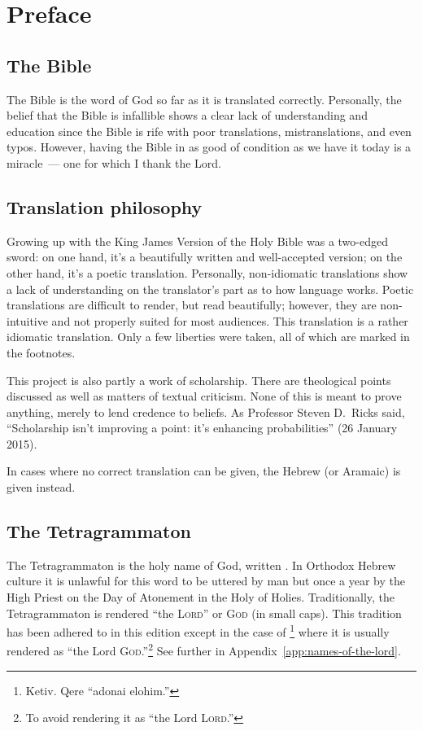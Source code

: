 \chapter{Preface}\thispagestyle{empty}
\section{The Bible}
The Bible is the word of God so far as it is translated correctly. Personally, the belief that the Bible is infallible shows a clear lack of understanding and education since the Bible is rife with poor translations, mistranslations, and even typos. However, having the Bible in as good of condition as we have it today is a miracle~--- one for which I thank the Lord.

\section{Translation philosophy}
Growing up with the King James Version of the Holy Bible was a two-edged sword: on one hand, it's a beautifully written and well-accepted version; on the other hand, it's a poetic translation. Personally, non-idiomatic translations show a lack of understanding on the translator's part as to how language works. Poetic translations are difficult to render, but read beautifully; however, they are non-intuitive and not properly suited for most audiences. This translation is a rather idiomatic translation. Only a few liberties were taken, all of which are marked in the footnotes.

This project is also partly a work of scholarship. There are theological points discussed as well as matters of textual criticism. None of this is meant to prove anything, merely to lend credence to beliefs. As Professor Steven D.\ Ricks said, ``Scholarship isn't improving a point: it's enhancing probabilities'' (26 January 2015).

In cases where no correct translation can be given, the Hebrew (or Aramaic) is given instead.

\section{The Tetragrammaton}
The Tetragrammaton is the holy name of God, written . In Orthodox Hebrew culture it is unlawful for this word to be uttered by man but once a year by the High Priest on the Day of Atonement in the Holy of Holies. Traditionally, the Tetragrammaton is rendered ``the \textsc{Lord}'' or \textsc{God} (in small caps). This tradition has been adhered to in this edition except in the case of \footnote{Ketiv. Qere ``adonai elohim.''} where it is usually rendered as ``the Lord \textsc{God}.''\footnote{To avoid rendering it as ``the Lord \textsc{Lord}.''} See further in Appendix~\ref{app:names-of-the-lord}.

